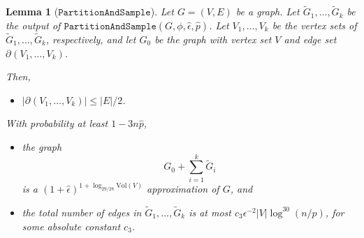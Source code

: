 \documentclass[11pt]{article}
\newtheorem{lemma}[theorem]{Lemma}
\newcommand{\partsample}{\ensuremath{\mathtt{PartitionAndSample}}}
\def\Gtil{\widetilde{G}}
\def\phat{\hat{p}}
\def\epshat{\hat{\epsilon}}
\def\bdry#1#2{\partial_{#1}\left(#2\right)}
\def\sizeof#1{\left|#1  \right|}
\def\vol#1{\mathrm{Vol}\left(#1  \right)}
\begin{document}
\begin{lemma}[\partsample]\label{lem:partsample}
Let $G = (V,E)$ be a graph.
Let $\Gtil_{1}, \dotsc , \Gtil_{k}$ be the output
  of $\partsample (G, \phi , \epshat , \phat  )$.
Let $V_{1}, \dotsc , V_{k}$ be the vertex sets of
  $\Gtil_{1}, \dotsc , \Gtil_{k}$, respectively, and let
  $G_{0}$ be the graph with vertex set $V$ and edge set
  $\bdry{}{V_{1}, \dotsc , V_{k}}$.


Then,
\begin{itemize}
\item [(PS.1)]
$\sizeof{\bdry{}{V_{1}, \dotsc , V_{k}}} \leq \sizeof{E}/2$.
\end{itemize}
With probability at least $1-3 n \phat $,
\begin{itemize}
\item [(PS.2)]
  the graph
\[
G_{0} + \sum_{i=1}^{k} \Gtil_{i}
\]
is a $(1+\epshat)^{1+\log_{29/28} \vol{V}}$ approximation of $G$, and
\item [(PS.3)]
the total number of edges in $\Gtil_{1}, \dotsc ,\Gtil_{k}$
  is at most $c_{3} \epsilon^{{-2}}\sizeof{V}\log^{30} (n/p)$, for some 
  absolute constant $c_{3}$.
\end{itemize}

\end{lemma}
\end{document}
